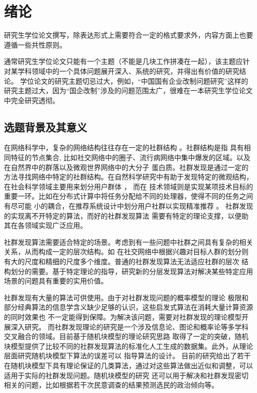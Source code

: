 
\chapter{绪论}

研究生学位论文撰写，除表达形式上需要符合一定的格式要求外，内容方面上也要遵循一些共性原则。

通常研究生学位论文只能有一个主题（不能是几块工作拼凑在一起），该主题应针对某学科领域中的一个具体问题展开深入、系统的研究，并得出有价值的研究结论。
学位论文的研究主题切忌过大，例如，“中国国有企业改制问题研究”这样的研究主题过大，因为“国企改制”涉及的问题范围太广，很难在一本研究生学位论文中完全研究透彻。


\section{选题背景及其意义}
在网络科学中，复杂的网络结构往往存在一定的社群结构 \cite{fortunato2010community} 。社群结构是指
具有相同特征的节点集合,
比如社交网络中的圈子、流行病网络中集中爆发的区域。以及在自然界中的群落以及微观世界网络中的大分子
蛋白质。社群发现是通过一定的方法寻找网络中特定的社群结构。在自然科学研究中有助于发现特定的微观结构，
在社会科学领域主要用来划分用户群体 \cite{6750167}，
而在
技术领域则是实现某项技术目标的重要一环。比如在分布式计算中将任务分配给不同的处理器，使得不同的任务之间有尽可能
小的耦合\cite{topcuoglu2002performance}，在推荐系统设计中划分用户社群以实现精准推荐 \cite{10.1145/2739480.2754670}。
社群发现的实现离不开特定的算法，而好的社群发现算法
需要有特定的理论支撑，以便助其在各领域实现广泛应用。

社群发现算法需要适合特定的场景。考虑到有一些问题中社群之间具有复杂的相关关系，从而构成一定的层次结构。如
在社交网络中根据兴趣对目标人群的划分则有大的尺度和精细的尺度多个维度。普通的社群发现算法无法适应社群的层次
结构划分的需要。基于特定理论的指导，研究新的分层发现算法对解决某些特定应用场景的问题具有重要的实用价值。

社群发现有大量的算法可供使用。由于对社群发现问题的概率模型的理论
极限和部分经典算法的信息学含义缺少足够的认识，这些启发式算法在消耗大量计算资源的同时效果也
不一定能得到保障。为解决该问题，需要对社群发现的理论模型开展深入研究。
而社群发现理论的研究是一个涉及信息论、图论和概率论等多学科交叉融合的领域。目前基于随机块模型的理论研究思路
取得了一定的突破，随机块模型提供了比较不同的社群发现算法的标准化人工生成的数据集。此外，从理论层面研究随机块模型下算法的误差可以
指导算法的设计。
目前的研究给出了若干
在随机块模型下具有理论保证的几类算法，通过对这些算法做出近似和调整，可以适用于实际的社群发现问题。随机块模型的研究
还可以用于解决和社群发现密切相关的问题，比如根据若干次民意调查的结果预测选民的政治倾向等。

